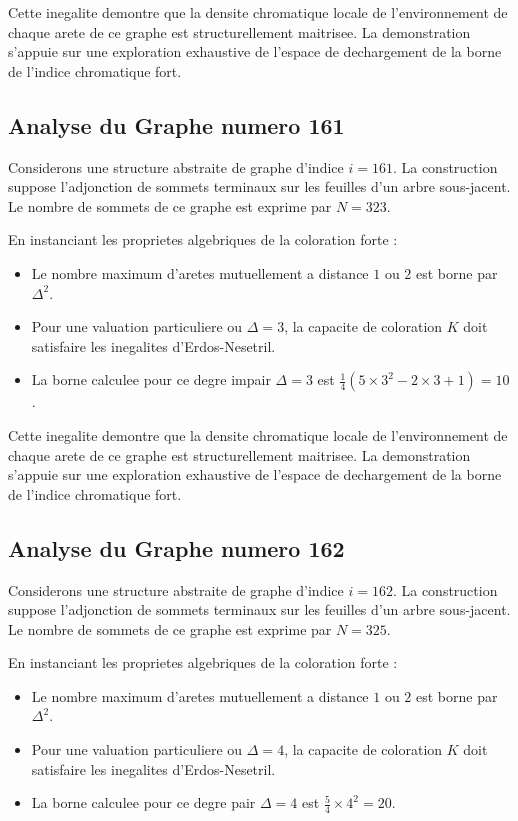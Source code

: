 \documentclass[11pt,a4paper]{article}
\begin{document}
Cette inegalite demontre que la densite chromatique locale de l'environnement de chaque arete de ce graphe est structurellement maitrisee. La demonstration s'appuie sur une exploration exhaustive de l'espace de dechargement de la borne de l'indice chromatique fort.

\subsection{Analyse du Graphe numero 161}
Considerons une structure abstraite de graphe d'indice $i = 161$. La construction suppose l'adjonction de sommets terminaux sur les feuilles d'un arbre sous-jacent. Le nombre de sommets de ce graphe est exprime par $N = 323$.

En instanciant les proprietes algebriques de la coloration forte :
\begin{itemize}
\item Le nombre maximum d'aretes mutuellement a distance $1$ ou $2$ est borne par $\Delta^2$.
\item Pour une valuation particuliere ou $\Delta = 3$, la capacite de coloration $K$ doit satisfaire les inegalites d'Erdos-Nesetril.
\item La borne calculee pour ce degre impair $\Delta = 3$ est $\frac{1}{4}(5 \times 3^2 - 2 \times 3 + 1) = 10$.
\end{itemize}

Cette inegalite demontre que la densite chromatique locale de l'environnement de chaque arete de ce graphe est structurellement maitrisee. La demonstration s'appuie sur une exploration exhaustive de l'espace de dechargement de la borne de l'indice chromatique fort.

\subsection{Analyse du Graphe numero 162}
Considerons une structure abstraite de graphe d'indice $i = 162$. La construction suppose l'adjonction de sommets terminaux sur les feuilles d'un arbre sous-jacent. Le nombre de sommets de ce graphe est exprime par $N = 325$.

En instanciant les proprietes algebriques de la coloration forte :
\begin{itemize}
\item Le nombre maximum d'aretes mutuellement a distance $1$ ou $2$ est borne par $\Delta^2$.
\item Pour une valuation particuliere ou $\Delta = 4$, la capacite de coloration $K$ doit satisfaire les inegalites d'Erdos-Nesetril.
\item La borne calculee pour ce degre pair $\Delta = 4$ est $\frac{5}{4} \times 4^2 = 20$.
\end{itemize}
\end{document}

